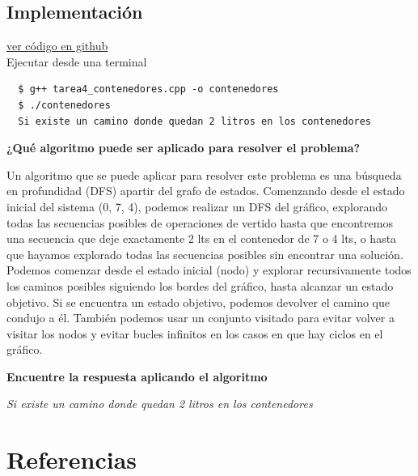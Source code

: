 \documentclass{article}
\begin{document}
\subsection{Implementación}
\href{https://github.com/luisballado/ADA/blob/main/practice_code/tarea4_contenedores.cpp}{ver código en github}\\

Ejecutar desde una terminal

\begin{commandline}
\begin{verbatim}
  $ g++ tarea4_contenedores.cpp -o contenedores
  $ ./contenedores
  Si existe un camino donde quedan 2 litros en los contenedores
\end{verbatim}
\end{commandline}

\begin{question}
  \textbf{¿Qué algoritmo puede ser aplicado para resolver el problema?}\\
\end{question}

Un algoritmo que se puede aplicar para resolver este problema es una búsqueda en profundidad (DFS) apartir del grafo de estados. Comenzando desde el estado inicial del sistema (0, 7, 4), podemos realizar un DFS del gráfico, explorando todas las secuencias posibles de operaciones de vertido hasta que encontremos una secuencia que deje exactamente 2 lts en el contenedor de  7 o 4 lts, o hasta que hayamos explorado todas las secuencias posibles sin encontrar una solución.\\

Podemos comenzar desde el estado inicial (nodo) y explorar recursivamente todos los caminos posibles siguiendo los bordes del gráfico, hasta alcanzar un estado objetivo. Si se encuentra un estado objetivo, podemos devolver el camino que condujo a él. También podemos usar un conjunto visitado para evitar volver a visitar los nodos y evitar bucles infinitos en los casos en que hay ciclos en el gráfico.\\

\begin{question}
  \textbf{Encuentre la respuesta aplicando el algoritmo}\\
\end{question}
\textit{Si existe un camino donde quedan 2 litros en los contenedores}

\section{Referencias}

\end{document}
